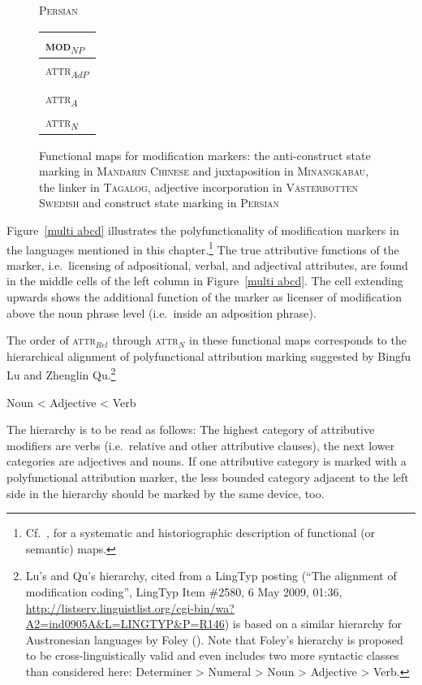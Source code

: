 \begin{figure}
{}
\parbox[b]{0.20\textwidth}{
\begin{center}\textsc{Persian}\\
\bigskip
\begin{tabular}{| l |}
\hline
\textsc{mod}$_{NP}$\\
\hline
\hline
\textsc{attr}$_{AdP}$\\
\hline
\\
\hline
\textsc{attr}$_{A}$\\
\hline
\textsc{attr}$_{N}$\\
\hline
\end{tabular}
\end{center}
}
\caption[Functional map for modification marking]{Functional maps for modification markers: the anti-construct state marking in \textsc{Mandarin Chinese} and juxtaposition in \textsc{Minangkabau}, the linker in \textsc{Tagalog}, adjective incorporation in \textsc{Västerbotten Swedish} and construct state marking in \textsc{Persian}
}
\end{figure}
Figure~\ref{multi abcd} illustrates the polyfunctionality of modification markers in the languages mentioned in this chapter.\footnote{Cf.~\cite{haspelmath2003}, for a systematic and historiographic description of functional (or semantic) maps.} The true attributive functions of the marker, i.e.~licensing of adpositional, verbal, and adjectival attributes, are found in the middle cells of the left column in Figure~\ref{multi abcd}. The cell extending upwards shows the additional function of the marker as licenser of modification above the noun phrase level (i.e.~inside an adposition phrase).%

The order of \textsc{attr}$_{Rel}$ through \textsc{attr}$_{N}$ in these functional maps corresponds to the hierarchical alignment of polyfunctional attribution marking suggested by Bingfu Lu and Zhenglin Qu.\footnote{Lu's and Qu's hierarchy, cited from a LingTyp posting (“The alignment of modification coding”, LingTyp Item \#2580, 6 May 2009, 01:36, \url{http://listserv.linguistlist.org/cgi-bin/wa?A2=ind0905A&L=LINGTYP&P=R146}) is based on a similar hierarchy for Austronesian languages by Foley (\citeyear{foley1980}). Note that Foley's hierarchy is proposed to be cross-linguistically valid and even includes two more syntactic classes than considered here: Determiner > Numeral > Noun > Adjective > Verb.}
\begin{exe}
\ex	Noun < Adjective < Verb
\end{exe}
The hierarchy is to be read as follows: The highest category of attributive modifiers are verbs (i.e.~relative and other attributive clauses), the next lower categories are adjectives and nouns. If one attributive category is marked with a polyfunctional attribution marker, the less bounded category adjacent to the left side in the hierarchy should be marked by the same device, too.

